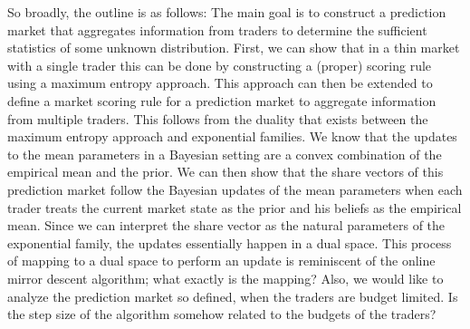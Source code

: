 So broadly, the outline is as follows: The main goal is to construct a prediction market that aggregates information from traders to determine the sufficient statistics of some unknown distribution. First, we can show that in a thin market with a single trader this can be done by constructing a (proper) scoring rule using a maximum entropy approach. This approach can then be extended to define a market scoring rule for a prediction market to aggregate information from multiple traders. This follows from the duality that exists between the maximum entropy approach and exponential families. We know that the updates to the mean parameters in a Bayesian setting are a convex combination of the empirical mean and the prior.  We can then show that the share vectors of this prediction market follow the Bayesian updates of the mean parameters when each trader treats the current market state as the prior and his beliefs as the empirical mean. Since we can interpret the share vector as the natural parameters of the exponential family, the updates essentially happen in a dual space.  This process of mapping to a dual space to perform an update is reminiscent of the online mirror descent algorithm; what exactly is the mapping? Also, we would like to analyze the prediction market so defined, when the traders are budget limited.  Is the step size of the algorithm somehow related to the budgets of the traders?